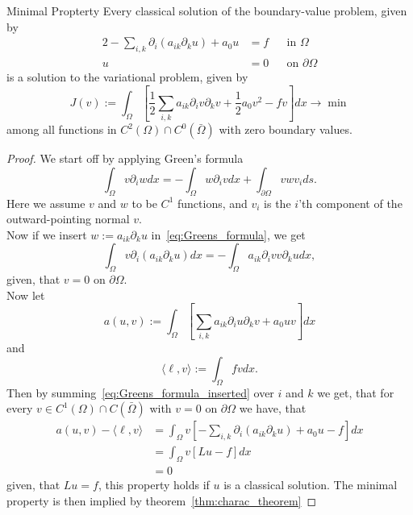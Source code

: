 \begin{thmx}{Minimal Propterty}
    Every classical solution of the boundary-value problem, given by
    \begin{alignat}{2}
        -\sum_{i,k} \partial_i (a_{ik}\partial_k u) + a_0 u &= f && \text{in } \Omega \\
        u &= 0 && \text{on } \partial \Omega
    \end{alignat}
    is a solution to the variational problem, given by
    \[
        J(v):=\int_\Omega [\frac{1}{2}\sum_{i,k} a_{ik} \partial_i v\partial_k v + \frac{1}{2} a_0 v^2 -fv]dx \longrightarrow \min
    \]
    among all functions in $C^2(\Omega)\cap C^0(\bar{\Omega})$ with zero boundary values. 
\end{thmx}

\begin{proof}
    We start off by applying Green's formula
    \[
    \label{eq:Greens_formula}
        \int_\Omega v\partial_i w dx = -\int_\Omega w\partial_i v dx + \int_{\partial \Omega} v w v_i ds.
    \]
    Here we assume $v$ and $w$ to be $C^1$ functions, and $v_i$ is the $i$'th component of the outward-pointing normal $v$.
    \\
    Now if we insert $w:=a_{ik}\partial_k u$ in~\eqref{eq:Greens_formula}, we get
    \[
    \label{eq:Greens_formula_inserted}
        \int_\Omega v\partial_i (a_{ik} \partial_k u) dx = -\int_\Omega a_{ik} \partial_i v v\partial_k u dx,
    \]  
    given, that $v=0$ on $\partial \Omega$.
    \\
    Now let 
    \begin{equation}
    \label{eq:a(u,v)}
        a(u,v) := \int_\Omega \left[\sum_{i,k} a_{ik} \partial_i u \partial_k v +a_0 uv \right]dx
    \end{equation}
    and
    \begin{equation}
    \label{eq:l(v)}
        \langle \ell,v \rangle := \int_\Omega fv dx.
    \end{equation}
    Then by summing~\eqref{eq:Greens_formula_inserted} over $i$ and $k$ we get, that for every $v\in C^1(\Omega) \cap C(\bar{\Omega})$ with $v=0$ on $\partial \Omega$ we have, that 
    \begin{align*}
        a(u,v) - \langle \ell,v \rangle &= \int_\Omega v\left[ -\sum_{i,k} \partial_i (a_{ik} \partial_k u) + a_0 u - f \right] dx \\     
        &= \int_\Omega v [Lu - f] dx \\
        &= 0
    \end{align*}
    given, that $Lu = f$, this property holds if $u$ is a classical solution. The minimal property is then implied by theorem~\ref{thm:charac_theorem}
\end{proof}